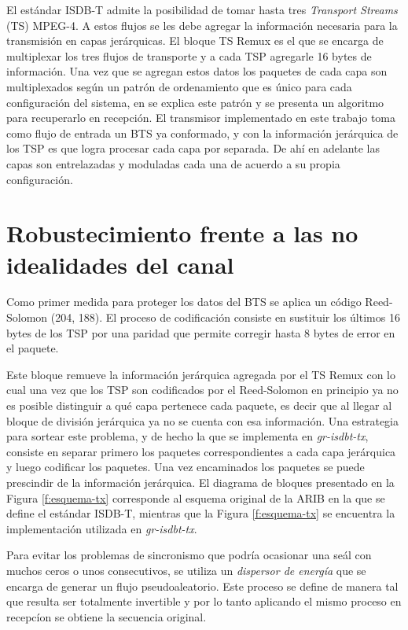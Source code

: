 El est\'andar ISDB-T admite la posibilidad de tomar hasta tres \textit{Transport Streams} (TS) MPEG-4. A estos flujos se les debe agregar la informaci\'on necesaria para la transmisi\'on en capas jer\'arquicas. El bloque TS Remux es el que se encarga de multiplexar los tres flujos de transporte y a cada TSP agregarle 16 bytes de informaci\'on. 
Una vez que se agregan estos datos los paquetes de cada capa son multiplexados seg\'un un patr\'on de ordenamiento que es \'unico para cada configuraci\'on del sistema, en \cite{multiplex-pattern} se explica este patr\'on y se presenta un algoritmo para recuperarlo en recepci\'on. El transmisor implementado en este trabajo toma como flujo de entrada un BTS ya conformado, y con la informaci\'on jer\'arquica de los TSP es que logra procesar cada capa por separada. De ah\'i en adelante las capas son entrelazadas y moduladas cada una de acuerdo a su propia configuraci\'on. 

\section{Robustecimiento frente a las no idealidades del canal}

Como primer medida para proteger los datos del BTS se aplica un c\'odigo Reed-Solomon (204, 188). El proceso de codificaci\'on consiste en sustituir los \'ultimos 16 bytes de los TSP por una paridad que permite corregir hasta 8 bytes de error en el paquete. 

Este bloque remueve la informaci\'on jer\'arquica agregada por el TS Remux con lo cual una vez que los TSP son codificados por el Reed-Solomon en principio ya no es posible distinguir a qu\'e capa pertenece cada paquete, es decir que al llegar al bloque de divisi\'on jer\'arquica ya no se cuenta con esa informaci\'on. Una estrategia para sortear este problema, y de hecho la que se implementa en \textit{gr-isdbt-tx}, consiste en separar primero los paquetes correspondientes a cada capa jer\'arquica y luego codificar los paquetes. Una vez encaminados los paquetes se puede prescindir de la informaci\'on jer\'arquica. El diagrama de bloques presentado en la Figura \ref{f:esquema-tx} corresponde al esquema original de la ARIB en la que se define el est\'andar ISDB-T, mientras que la Figura \ref{f:esquema-tx} se encuentra la implementaci\'on utilizada en \textit{gr-isdbt-tx}. 

Para evitar los problemas de sincronismo que podr\'ia ocasionar una se\'al con muchos ceros o unos consecutivos, se utiliza un \textit{dispersor de energ\'ia} que se encarga de generar un flujo pseudoaleatorio. Este proceso se define de manera tal que resulta ser totalmente invertible y por lo tanto aplicando el mismo proceso en recepc\'ion se obtiene la secuencia original.



